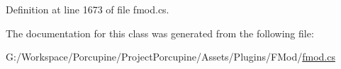 Definition at line 1673 of file fmod.\+cs.



The documentation for this class was generated from the following file\+:\begin{DoxyCompactItemize}
\item 
G\+:/\+Workspace/\+Porcupine/\+Project\+Porcupine/\+Assets/\+Plugins/\+F\+Mod/\hyperlink{fmod_8cs}{fmod.\+cs}\end{DoxyCompactItemize}
